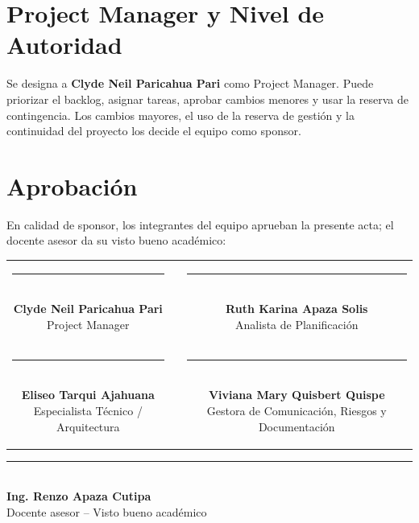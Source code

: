 \documentclass[11pt,a4paper]{article}
\begin{document}
\section{Project Manager y Nivel de Autoridad}
Se designa a \textbf{Clyde Neil Paricahua Pari} como Project Manager. Puede priorizar el backlog, asignar tareas, aprobar cambios menores y usar la reserva de contingencia. Los cambios mayores, el uso de la reserva de gestión y la continuidad del proyecto los decide el equipo como sponsor.

\section{Aprobación}
\noindent En calidad de sponsor, los integrantes del equipo aprueban la presente acta; el docente asesor da su visto bueno académico:

\vspace{1.5cm}
\begin{center}
\begin{tabular}{c c c}
    \parbox{6.5cm}{\centering \rule{6.0cm}{0.6pt}\\[5pt] \textbf{Clyde Neil Paricahua Pari}\\[2pt] {\footnotesize Project Manager}}
    & \hspace{0.8cm} &
    \parbox{6.5cm}{\centering \rule{6.0cm}{0.6pt}\\[5pt] \textbf{Ruth Karina Apaza Solis}\\[2pt] {\footnotesize Analista de Planificación}}
    \\[2.0cm]
    \parbox{6.5cm}{\centering \rule{6.0cm}{0.6pt}\\[5pt] \textbf{Eliseo Tarqui Ajahuana}\\[2pt] {\footnotesize Especialista Técnico / Arquitectura}}
    & \hspace{0.8cm} &
    \parbox{6.5cm}{\centering \rule{6.0cm}{0.6pt}\\[5pt] \textbf{Viviana Mary Quisbert Quispe}\\[2pt] {\footnotesize Gestora de Comunicación, Riesgos y Documentación}}
\end{tabular}
\end{center}

\vspace{1.2cm}
\begin{center}
\parbox{8cm}{\centering \rule{7.0cm}{0.6pt}\\[5pt] \textbf{Ing. Renzo Apaza Cutipa}\\[2pt] {\footnotesize Docente asesor -- Visto bueno académico}}
\end{center}
\end{document}

